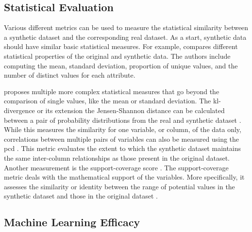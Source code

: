 \subsection{Statistical Evaluation}
\label{ch:preliminaries-statisticalEvaluation}

Various different metrics can be used to measure the statistical similarity between a synthetic dataset and the corresponding real dataset.
As a start, synthetic data should have similar basic statistical measures.
For example, \textcite{delcarmenrodriguez-hernandez2017DataGenCARSGeneratorSynthetic} compares different statistical properties of the original and synthetic data. 
The authors include computing the mean, standard deviation, proportion of unique values, and the number of distinct values for each attribute.

\textcite{goncalves2020GenerationEvaluationSynthetic} proposes multiple more complex statistical measures that go beyond the comparison of single values, like the mean or standard deviation.
The \gls{kl}-divergence or its extension the Jensen-Shannon distance can be calculated between a pair of probability distributions from the real and synthetic dataset \cite{goncalves2020GenerationEvaluationSynthetic, li2022TTSGANTransformerbasedTimeSeries, zhao2022CTABGANEnhancingTabular}.
While this measures the similarity for one variable, or column, of the data only, correlations between multiple pairs of variables can also be measured using the \gls{pcd} \cite{goncalves2020GenerationEvaluationSynthetic}.
This metric evaluates the extent to which the synthetic dataset maintains the same inter-column relationships as those present in the original dataset.
Another measurement is the support-coverage score \cite{goncalves2020GenerationEvaluationSynthetic}.
The support-coverage metric deals with the mathematical support of the variables. 
More specifically, it assesses the similarity or identity between the range of potential values in the synthetic dataset and those in the original dataset \cite{goncalves2020GenerationEvaluationSynthetic}.

\subsection{Machine Learning Efficacy}
\label{ch:preliminaries-machineLearningEfficacy}

